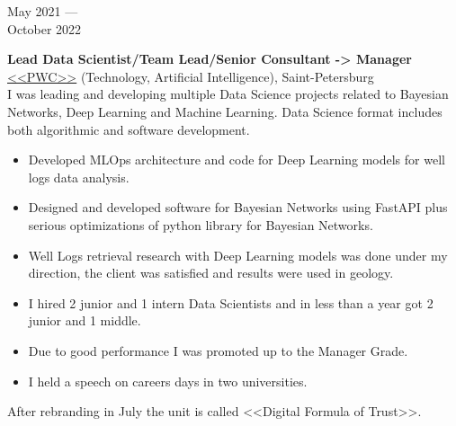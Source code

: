 \documentclass[10pt,a4paper]{article}
\newcommand{\lmpratio}{0.15}
\newcommand{\rmpratio}{0.74}
\newcommand{\vSpace}{0.5cm}
\newcommand{\horizontalSpace}{0.05\textwidth}
\newcommand{\sectionMain}[1]{\textbf{#1}}
\begin{document}
 
	\begin{minipage}[t]{\lmpratio\textwidth}
		May 2021 --- \\October 2022
	\end{minipage}
	\hspace{\horizontalSpace}
	\begin{minipage}[t]{\rmpratio\textwidth}
		\sectionMain{Lead Data Scientist/Team Lead/Senior Consultant -> Manager}\\
		\href{https://www.pwc.ru/}{<<PWC>>} (Technology, Artificial Intelligence), Saint-Petersburg\\[0.1cm]		

I was leading and developing multiple Data Science projects related to Bayesian Networks, Deep Learning and Machine Learning.
Data Science format includes both algorithmic and software development.

		\begin{itemize}
                \item 
Developed MLOps architecture and code for Deep Learning models for well logs data analysis.
			\item 
Designed and developed software for Bayesian Networks using FastAPI plus serious optimizations of python library for Bayesian Networks.
			\item 
Well Logs retrieval research with Deep Learning models was done under my direction, the client was satisfied and results were used in geology.
                \item 
I hired 2 junior and 1 intern Data Scientists and in less than a year got 2 junior and 1 middle.
                \item 
Due to good performance I was promoted up to the Manager Grade.
                \item 
I held a speech on careers days in two universities.
		\end{itemize}
		
After rebranding in July the unit is called <<Digital Formula of Trust>>.
		
	\end{minipage}	
	\vspace{\vSpace}
	
\end{document}
